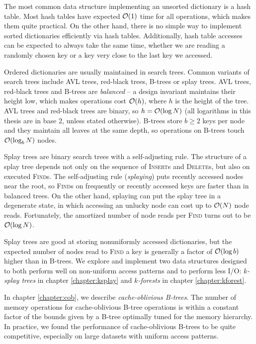The most common data structure implementing an unsorted dictionary is a hash
table. Most hash tables have expected $\mathcal{O}(1)$ time for all operations, which
makes them quite practical. On the other hand, there is no simple way to
implement sorted dictionaries efficiently via hash tables. Additionally,
hash table accesses can be expected to always take the same time, whether
we are reading a randomly chosen key or a key very close to the last key we
accessed.

Ordered dictionaries are usually maintained in search trees. Common variants
of search trees include AVL trees, red-black trees, B-trees or splay trees.
AVL trees, red-black trees and B-trees are \textit{balanced} -- a design
invariant maintains their height low, which makes operations cost $\mathcal{O}(h)$, where
$h$ is the height of the tree. AVL trees and red-black trees are binary,
so $h=\mathcal{O}(\log N)$ (all logarithms in this thesis are in base 2, unless stated
otherwise). B-trees store $b\geq 2$ keys per node and they maintain all leaves
at the same depth, so operations on B-trees touch $\mathcal{O}(\log_b N)$ nodes.

Splay trees are binary search trees with a self-adjusting rule.
The structure of a splay tree depends not only on the sequence of
\textsc{Insert}s and \textsc{Delete}s, but also on executed \textsc{Find}s.
The self-adjusting rule (\textit{splaying}) puts recently accessed nodes
near the root, so \textsc{Find}s on frequently or recently accessed keys
are faster than in balanced trees. On the other hand, splaying can put
the splay tree in a degenerate state, in which accessing an unlucky node can
cost up to $\mathcal{O}(N)$ node reads. Fortunately, the amortized number of node
reads per \textsc{Find} turns out to be $\mathcal{O}(\log N)$.

Splay trees are good at storing nonuniformly accessed dictionaries, but
the expected number of nodes read to \textsc{Find} a key is generally a factor
of $\mathcal{O}(\log b)$ higher than in B-trees. We explore and implement two
data structures designed to both perform well on non-uniform access patterns
and to perform less I/O: \textit{$k$-splay trees} in chapter
\ref{chapter:ksplay} and \textit{$k$-forests} in chapter \ref{chapter:kforest}.

In chapter \ref{chapter:cob}, we describe \textit{cache-oblivious B-trees}.
The number of memory operations for cache-oblivious B-tree operations
is within a constant factor of the bounds given by a B-tree optimally tuned
for the memory hierarchy. In practice, we found the performance of
cache-oblivious B-trees to be quite competitive, especially on large datasets
with uniform access patterns.
